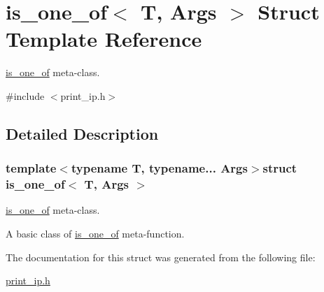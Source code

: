 \hypertarget{structis__one__of}{\section{is\-\_\-one\-\_\-of$<$ T, Args $>$ Struct Template Reference}
\label{structis__one__of}
}


\hyperlink{structis__one__of}{is\-\_\-one\-\_\-of} meta-\/class.  




{\ttfamily \#include $<$print\-\_\-ip.\-h$>$}



\subsection{Detailed Description}
\subsubsection*{template$<$typename T, typename... Args$>$struct is\-\_\-one\-\_\-of$<$ T, Args $>$}

\hyperlink{structis__one__of}{is\-\_\-one\-\_\-of} meta-\/class. 

A basic class of \hyperlink{structis__one__of}{is\-\_\-one\-\_\-of} meta-\/function. 

The documentation for this struct was generated from the following file\-:\begin{DoxyCompactItemize}
\item 
\hyperlink{print__ip_8h}{print\-\_\-ip.\-h}\end{DoxyCompactItemize}
